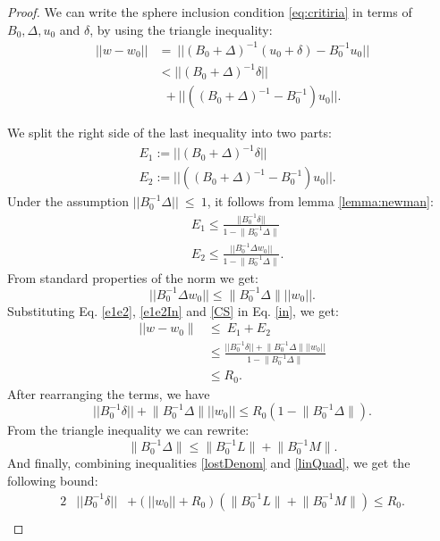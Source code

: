 \begin{proof}
We can write the sphere inclusion condition \ref{eq:critiria} in terms of $B_0, \Delta, u_0$ and $\delta$, by using the triangle inequality:
\begin{equation} \label{in}
\begin{split}
||w-w_0|| & = \ ||(B_0+\Delta)^{-1}(u_0+\delta) - B_0^{-1}u_0|| \\
& < ||(B_0+\Delta)^{-1}\delta|| \\
& \ \ + ||((B_0+\Delta)^{-1} - B_0^{-1})u_0||.
\end{split}
\end{equation}

We split the right side of the last inequality into two parts:
\begin{equation}  \label{e1e2}
\begin{split}
& E_1:= ||(B_0+\Delta)^{-1}\delta|| \\
& E_2:= ||((B_0+\Delta)^{-1} - B_0^{-1})u_0||.
\end{split}
\end{equation}
Under the assumption  $||B_0^{-1}\Delta||\ \leq \ 1$,
it follows from lemma \ref{lemma:newman}:
\begin{equation} \label{e1e2In}
\begin{split}
& E_1 \leq \frac{||B_0^{-1}\delta||}{1-\Big \|B_0^{-1}\Delta\Big \|} \\
& E_2 \leq  \frac{|| B_0^{-1}\Delta w_0||}{1-\Big \|B_0^{-1}\Delta\Big \|}.
\end{split}
\end{equation}
From standard properties of the norm we get:
\begin{equation} \label{CS}
||B_0^{-1}\Delta w_0||  \leq  \Big \|B_0^{-1}\Delta \Big \| ||w_0||.
\end{equation}
Substituting Eq. \ref{e1e2}, \ref{e1e2In} and \ref{CS} in Eq. \ref{in}, we
get:
\begin{equation}
\begin{split}
|| w-w_0 \parallel & \leq \ E_1+E_2 \\
& \leq \frac{||B_0^{-1}\delta|| + \Big \|B_0^{-1}\Delta\Big \|||w_0||}{1 -\Big \|B_0^{-1}\Delta \Big \|} \\
& \leq R_0.
\end{split}
\end{equation}
After rearranging the terms, we have
\begin{equation} \label{lostDenom}
||B_0^{-1}\delta|| + \Big \|B_0^{-1}\Delta \Big \| ||w_0||
\leq R_0(1 -\Big \|B_0^{-1}\Delta\Big \|).
\end{equation}
From the triangle inequality we can rewrite:
\begin{equation} \label{linQuad}
\Big \|B_0^{-1}\Delta\Big \| \leq \Big \|B_0^{-1}L\Big \|+\Big \|B_0^{-1}M\Big \|.
\end{equation}
And finally, combining inequalities \ref{lostDenom} and \ref{linQuad},
we get the following bound:
\begin{alignat*}{2} \label{convexBound}
&||B_0^{-1}\delta|| &+ (||w_0||+R_0)(\Big \|B_0^{-1}L\Big \|+\Big \|B_0^{-1}M\Big \|)  \leq R_0. \\
&
\end{alignat*}
\end{proof}

